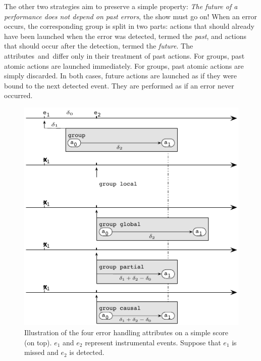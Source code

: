 \documentclass[preprint]{sigplanconf}
\begin{document}
The other two strategies aim to preserve a simple property: \emph{The
  future of a performance does not depend on past errors}, \ie the
show must go on! When an error occurs, the corresponding group is
split in two parts: actions that should already have been launched
when the error was detected, termed the \emph{past}, and actions that
should occur after the detection, termed the \emph{future}.  The
attributes~\partial and~\causal differ only in their treatment of past
actions. For \causal groups, past atomic actions are launched
immediately. For \partial groups, past atomic actions are simply
discarded. In both cases, future actions are launched as if they were
bound to the next detected event. They are performed as if an error
never occurred.

\begin{figure}
\centering
\includegraphics[scale = 1]{error_behaviors.pdf}
\caption{Illustration of the four error handling attributes on a
  simple score (on top). $e_1$ and $e_2$ represent instrumental events. Suppose that $e_1$ is missed and $e_2$ is detected.}
\label{fig:error_behaviors}
\end{figure}





\newpage
\end{document}
